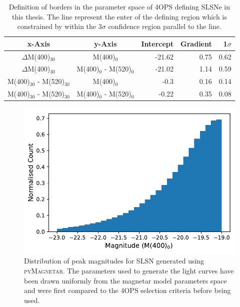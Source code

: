\begin{table}
  \caption{Definition of borders in the parameter space of 4OPS defining SLSNe in this thesis. The line represent the enter of the defining region which is constrained by within the 3$\sigma$ confidence region parallel to the line.}
  \label{tab:4OPS}
  \begin{tabular}{c|c|r|r|r}
    x-Axis & y-Axis & Intercept & Gradient & 1$\sigma$ \\
    \hline
    $\Delta$M(400)$_{30}$ & M(400)$_0$ & -21.62 & 0.75 & 0.62 \\
    $\Delta$M(400)$_{30}$ & M(400)$_0$ - M(520)$_0$ & -21.02 & 1.14 & 0.59 \\
    M(400)$_{30}$ - M(520)$_{30}$ & M(400)$_0$ & -0.3 & 0.16 & 0.14 \\
    M(400)$_{30}$ - M(520)$_{30}$ & M(400)$_0$ - M(520)$_0$ & -0.22 & 0.35 & 0.08
  \end{tabular}
\end{table}

\begin{figure}
  \includegraphics[width=\textwidth]{Figures/Chapter5/MagDist}
  \caption{Distribution of peak magnitudes for SLSN generated using \textsc{pyMagnetar}. The parameters used to generate the light curves have been drawn uniformly from the magnetar model parameters space and were first compared to the 4OPS selection criteria before being used.}
  \label{fig:4OPSParams}
\end{figure}

